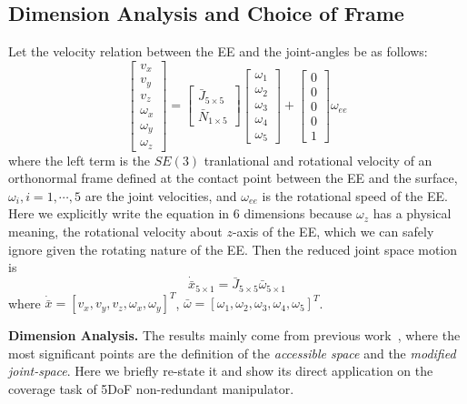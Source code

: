 \documentclass[Afour,sageh,times]{sagej}
\begin{document}
\subsection{Dimension Analysis and Choice of Frame}
Let the velocity relation between the EE and the joint-angles be as follows: 
\begin{equation}\label{equ_total}
\left[
\begin{matrix}
v_x\\
v_y\\
v_z\\
\omega_x\\
\omega_y\\
\omega_z
\end{matrix}
\right]= \left[
\begin{matrix}
\bar{J}_{5\times 5}\\
\bar{N}_{1\times 5}
\end{matrix}
\right]\left[
\begin{matrix}
\omega_1\\
\omega_2\\
\omega_3\\
\omega_4\\
\omega_5
\end{matrix}
\right] + \left[
\begin{matrix}
0\\
0\\
0\\
0\\
1
\end{matrix}
\right]
\omega_{ee}
\end{equation}
where the left term is the $SE(3)$ tranlational and rotational velocity of an orthonormal frame defined at the contact point between the EE and the surface, $\omega_i, i = 1, \cdots, 5$ are the joint velocities, and $\omega_{ee}$ is the rotational speed of the EE. Here we explicitly write the equation in $6$ dimensions because $\omega_z$ has a physical meaning, the rotational velocity about $z$-axis of the EE, which we can safely ignore given the rotating nature of the EE. Then the reduced joint space motion is 
\begin{equation}
\dot{\bar{x}}_{5\times 1} = \bar{J}_{5\times 5}\bar{\omega}_{5\times 1}
\end{equation}
where $\dot{\bar{x}} = \left[ v_x, v_y, v_z, \omega_x, \omega_y \right]^T$, $\bar{\omega} = \left[ \omega_1, \omega_2, \omega_3, \omega_4, \omega_5 \right]^T$.

\textbf{Dimension Analysis. }
The results mainly come from previous work~\cite{Singh1993Motion}, where the most significant points are the definition of the \textit{accessible space} and the \textit{modified joint-space}. Here we briefly re-state it and show its direct application on the coverage task of 5DoF non-redundant manipulator. 
\end{document}

